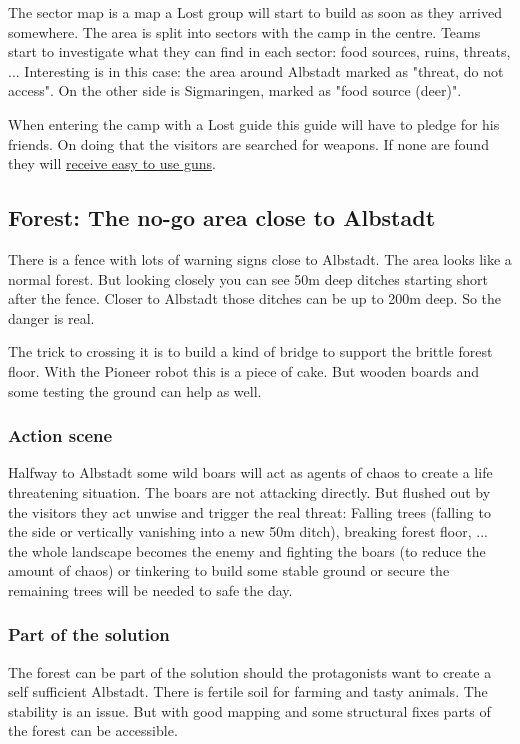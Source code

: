 The sector map is a map a Lost group will start to build as soon as they arrived somewhere. The area is split into sectors with the camp in the centre. Teams start to investigate what they can find in each sector: food sources, ruins, threats, ... Interesting is in this case: the area around Albstadt marked as "threat, do not access". On the other side is Sigmaringen, marked as "food source (deer)".

When entering the camp with a Lost guide this guide will have to pledge for his friends. On doing that the visitors are searched for weapons. If none are found they will \hyperref[sec:Lost guests and weapons]{receive easy to use guns}.

\subsection{Forest: The no-go area close to Albstadt}

There is a fence with lots of warning signs close to Albstadt. The area looks like a normal forest. But looking closely you can see 50m deep ditches starting short after the fence. Closer to Albstadt those ditches can be up to 200m deep. So the danger is real.

The trick to crossing it is to build a kind of bridge to support the brittle forest floor. With the Pioneer robot this is a piece of cake. But wooden boards and some testing the ground can help as well.


\subsubsection{Action scene}

Halfway to Albstadt some wild boars will act as agents of chaos to create a life threatening situation. The boars are not attacking directly. But flushed out by the visitors they act unwise and trigger the real threat: Falling trees (falling to the side or vertically vanishing into a new 50m ditch), breaking forest floor, ...
the whole landscape becomes the enemy and fighting the boars (to reduce the amount of chaos) or tinkering to build some stable ground or secure the remaining trees will be needed to safe the day.

\subsubsection{Part of the solution}

The forest can be part of the solution should the protagonists want to create a self sufficient Albstadt. There is fertile soil for farming and tasty animals. The stability is an issue. But with good mapping and some structural fixes parts of the forest can be accessible.

